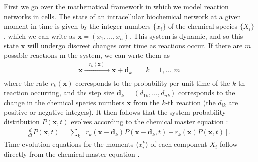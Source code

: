 \documentclass[%
 reprint,prx,
superscriptaddress,
%
%
%
%
%
%
%
%
%
 amsmath,amssymb,
 aps,
%
%
%
%
%
%
]{revtex4-2}
\newlength{\arrow}
\begin{document}
First we go over the mathematical framework in which we model reaction networks in cells.
The state of an intracellular biochemical network at a given moment in time is given by the integer numbers $\{x_{i}\}$ of the chemical species $\{X_{i}\}$, which we can write as 
$\mathbf{x} = (x_{1}, \dots, x_{n})$.
This system is dynamic, and so this state $\mathbf{x}$ will undergo discreet changes over time as reactions occur. If there are $m$ possible reactions in the system, we can write them as
\begin{align*}
    \mathbf{x} \xrightarrow[]{\quad r_{k}(\mathbf{x}) \quad} \mathbf{x} + \mathbf{d}_{k}  \qquad k = 1,\dots,m 
\end{align*}
where the rate $r_{k}(\mathbf{x})$ corresponds to the probability per unit time of the $k$-th reaction occurring, and the step size $\mathbf{d}_{k} = (d_{1k}, \dots, d_{nk})$ 
corresponds to the change in the chemical species numbers $\mathbf{x}$ from the $k$-th reaction (the $d_{ik}$ are positive or negative integers).
It then follows that the system probability distribution $P(\mathbf{x},t)$ evolves according to the chemical master equation \cite{vank1992, Lestas2008}:
\begin{align*}
    \frac{d}{dt}P(\mathbf{x},t) = \sum_{k}\left[r_{k}(\mathbf{x} - \mathbf{d}_{k})P(\mathbf{x} - \mathbf{d}_{k},t) - r_{k}(\mathbf{x})P(\mathbf{x},t)\right] .
\end{align*}
Time evolution equations for the moments $\langle x_{i}^{k} \rangle$ of each component $X_{i}$ follow directly from the chemical master equation  \cite{Lestas2008}. 


%
\vspace{-.5em}
\end{document}
